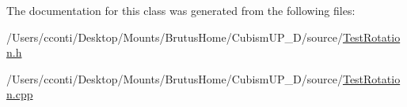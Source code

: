The documentation for this class was generated from the following files\+:\begin{DoxyCompactItemize}
\item 
/\+Users/cconti/\+Desktop/\+Mounts/\+Brutus\+Home/\+Cubism\+U\+P\+\_\+D/source/\hyperlink{_test_rotation_8h}{Test\+Rotation.\+h}\item 
/\+Users/cconti/\+Desktop/\+Mounts/\+Brutus\+Home/\+Cubism\+U\+P\+\_\+D/source/\hyperlink{_test_rotation_8cpp}{Test\+Rotation.\+cpp}\end{DoxyCompactItemize}
